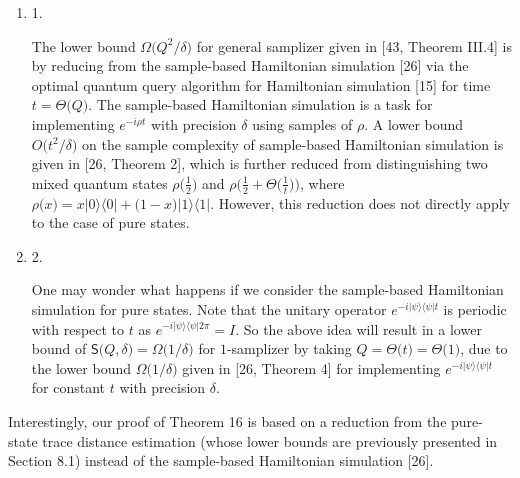 \documentclass[10pt,a4paper]{article}
\begin{document}
\begin{enumerate}


\item[] 
1. 


The lower bound $\Omega\lparen Q^{2}/\delta\rparen$ for general samplizer given in [43, Theorem III.4] is by reducing from the sample-based Hamiltonian simulation [26] via the optimal quantum query algorithm for Hamiltonian simulation [15] for time $t=\Theta\lparen Q\rparen$.
The sample-based Hamiltonian simulation is a task for implementing $e^{-i\rho t}$ with precision $\delta$ using samples of $\rho$. A lower bound $O\lparen t^{2}/\delta\rparen$ on the sample complexity of sample-based Hamiltonian simulation is given in [26, Theorem 2], which is further reduced from distinguishing two mixed quantum states $\rho\lparen\frac{1}{2}\rparen$ and $\rho\lparen\frac{1}{2}+\Theta\lparen\frac{1}{t}\rparen\rparen$, where $\rho\lparen x\rparen=x\lvert 0\rangle\!\langle 0\rvert+\lparen 1-x\rparen\lvert 1\rangle\!\langle 1\rvert$.
However, this reduction does not directly apply to the case of pure states.\par





\item[] 
2. 


One may wonder what happens if we consider the sample-based Hamiltonian simulation for pure states. Note that the unitary operator $e^{-i\lvert\psi\rangle\!\langle\psi\rvert t}$ is periodic with respect to $t$ as $e^{-i\lvert\psi\rangle\!\langle\psi\rvert 2\pi}=I$.
So the above idea will result in a lower bound of $\mathsf{S}\lparen Q,\delta\rparen=\Omega\lparen 1/\delta\rparen$ for $1$-samplizer by taking $Q=\Theta\lparen t\rparen=\Theta\lparen 1\rparen$, due to the lower bound $\Omega\lparen 1/\delta\rparen$ given in [26, Theorem 4] for implementing $e^{-i\lvert\psi\rangle\!\langle\psi\rvert t}$ for constant $t$ with precision $\delta$.\par





\end{enumerate}




Interestingly, our proof of Theorem 16 is based on a reduction from the pure-state trace distance estimation (whose lower bounds are previously presented in Section 8.1) instead of the sample-based Hamiltonian simulation [26].\par
\end{document}
